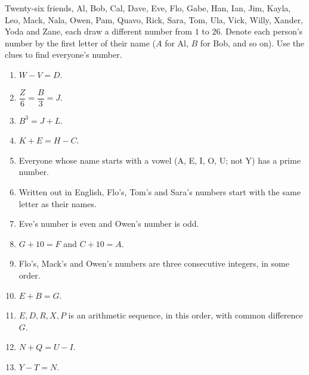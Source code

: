 Twenty-six friends, Al, Bob, Cal, Dave, Eve, Flo, Gabe, Han, Ian, Jim, Kayla, Leo, Mack, Nala, Owen, Pam, Quavo, Rick, Sara, Tom, Ula, Vick, Willy, Xander, Yoda and Zane, each draw a different number from $1$ to $26$. Denote each person's number by the first letter of their name ($A$ for Al, $B$ for Bob, and so on). Use the clues to find everyone's number.
\begin{enumerate}
\item $W-V=D$.
\item $\dfrac Z6=\dfrac B3=J$.
\item $B^3=J+L$.
\item $K+E=H-C$.
\item Everyone whose name starts with a vowel (A, E, I, O, U; not Y) has a prime number.
\item Written out in English, Flo's, Tom's and Sara's numbers start with the same letter as their names.
\item Eve's number is even and Owen's number is odd.
\item $G+10=F$ and $C+10=A$.
\item Flo's, Mack's and Owen's numbers are three consecutive integers, in some order.
\item $E+B=G$.
\item $E,D,R,X,P$ is an arithmetic sequence, in this order, with common difference $G$.
\item $N+Q=U-I$.
\item $Y-T=N$.
\end{enumerate}
